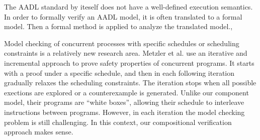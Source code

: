 The AADL standard by iteself does not have a well-defined execution semantics. In order to formally verify an AADL model, it is often translated to a formal model. Then a formal method is applied to analyze the translated model.\cite{AADL2TASM}, \cite{AADL2TLA} \cite{AADS} \cite{AADL2BIP}

Model checking of concurrent processes with specific schedules or scheduling constraints is a relatively new research area. Metzler et al. \cite{Metzler2020} use an iterative and incremental approach to prove safety properties of concurrent programs. It starts with a proof under a specific schedule, and then in each following iteration gradually relaxes the scheduling constraints. The iteration stops when all possible exections are explored or a counterexample is generated. Unlike our component model, their programs are ``white boxes'', allowing their schedule to interleave instructions between programs. However, in each iteration the model checking problem is 
still challenging. In this context, our compositional verification approach makes sense.
